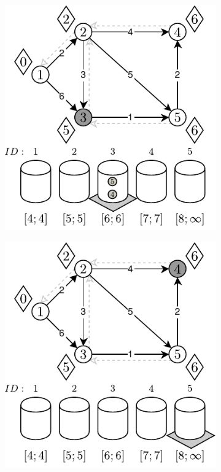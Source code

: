 \begin{figure}[!htbp]
\begin{subfigure}[b]{0.33\textwidth}
		\caption{}
	\end{subfigure}%
	\begin{subfigure}[b]{0.33\textwidth}
		\includegraphics[width=\textwidth]{Chapter_II/1/e.pdf}
		\caption{}
	\end{subfigure}
	\begin{subfigure}[b]{0.33\textwidth}
		\includegraphics[width=\textwidth]{Chapter_II/1/f.pdf}

\end{subfigure}
\end{figure}
